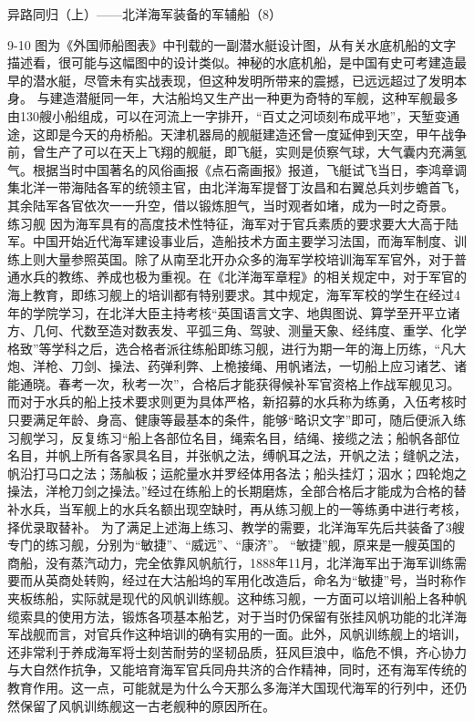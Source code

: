 \documentclass[12pt,UTF8]{ctexbook}
\begin{document}
异路同归（上）——北洋海军装备的军辅船（8）

9-10
图为《外国师船图表》中刊载的一副潜水艇设计图，从有关水底机船的文字描述看，很可能与这幅图中的设计类似。神秘的水底机船，是中国有史可考建造最早的潜水艇，尽管未有实战表现，但这种发明所带来的震撼，已远远超过了发明本身。
与建造潜艇同一年，大沽船坞又生产出一种更为奇特的军舰，这种军舰最多由130艘小船组成，可以在河流上一字排开，“百丈之河顷刻布成平地”，天堑变通途，这即是今天的舟桥船。天津机器局的舰艇建造还曾一度延伸到天空，甲午战争前，曾生产了可以在天上飞翔的舰艇，即飞艇，实则是侦察气球，大气囊内充满氢气。根据当时中国著名的风俗画报《点石斋画报》报道，飞艇试飞当日，李鸿章调集北洋一带海陆各军的统领主官，由北洋海军提督丁汝昌和右翼总兵刘步蟾首飞，其余陆军各官依次一一升空，借以锻炼胆气，当时观者如堵，成为一时之奇景。
练习舰
因为海军具有的高度技术性特征，海军对于官兵素质的要求要大大高于陆军。中国开始近代海军建设事业后，造船技术方面主要学习法国，而海军制度、训练上则大量参照英国。除了从南至北开办众多的海军学校培训海军军官外，对于普通水兵的教练、养成也极为重视。在《北洋海军章程》的相关规定中，对于军官的海上教育，即练习舰上的培训都有特别要求。其中规定，海军军校的学生在经过4年的学院学习，在北洋大臣主持考核“英国语言文字、地舆图说、算学至开平立诸方、几何、代数至造对数表发、平弧三角、驾驶、测量天象、经纬度、重学、化学格致”等学科之后，选合格者派往练船即练习舰，进行为期一年的海上历练，“凡大炮、洋枪、刀剑、操法、药弹利弊、上桅接绳、用帆诸法，一切船上应习诸艺、诸能通晓。春考一次，秋考一次”，合格后才能获得候补军官资格上作战军舰见习。
而对于水兵的船上技术要求则更为具体严格，新招募的水兵称为练勇，入伍考核时只要满足年龄、身高、健康等最基本的条件，能够“略识文字”即可，随后便派入练习舰学习，反复练习“船上各部位名目，绳索名目，结绳、接缆之法；船帆各部位名目，并帆上所有各家具名目，并张帆之法，缚帆耳之法，开帆之法；缝帆之法，帆沿打马口之法；荡舢板；运舵量水并罗经体用各法；船头挂灯；泅水；四轮炮之操法，洋枪刀剑之操法。”经过在练船上的长期磨炼，全部合格后才能成为合格的替补水兵，当军舰上的水兵名额出现空缺时，再从练习舰上的一等练勇中进行考核，择优录取替补。
为了满足上述海上练习、教学的需要，北洋海军先后共装备了3艘专门的练习舰，分别为“敏捷”、“威远”、“康济”。
“敏捷”舰，原来是一艘英国的商船，没有蒸汽动力，完全依靠风帆航行，1888年11月，北洋海军出于海军训练需要而从英商处转购，经过在大沽船坞的军用化改造后，命名为“敏捷”号，当时称作夹板练船，实际就是现代的风帆训练舰。这种练习舰，一方面可以培训船上各种帆缆索具的使用方法，锻炼各项基本船艺，对于当时仍保留有张挂风帆功能的北洋海军战舰而言，对官兵作这种培训的确有实用的一面。此外，风帆训练舰上的培训，还非常利于养成海军将士刻苦耐劳的坚韧品质，狂风巨浪中，临危不惧，齐心协力与大自然作抗争，又能培育海军官兵同舟共济的合作精神，同时，还有海军传统的教育作用。这一点，可能就是为什么今天那么多海洋大国现代海军的行列中，还仍然保留了风帆训练舰这一古老舰种的原因所在。
\end{document}
